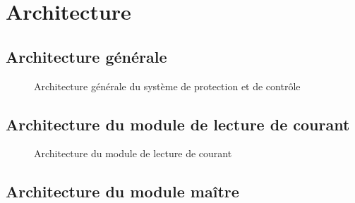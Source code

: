 \section{Architecture}
	
	\subsection{Architecture générale}
		\begin{figure}[H]
			\centering
			\caption{Architecture générale du système de protection et de contrôle}
			\label{fig:architecture_generale}
		\end{figure}
	
	\subsection{Architecture du module de lecture de courant}
		\begin{figure}[H]
			\centering
			\caption{Architecture du module de lecture de courant}
			\label{fig:architecturelecturecourant}
		\end{figure}
	\subsection{Architecture du module maître}
	

